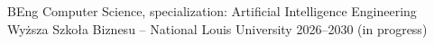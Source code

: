 

\begin{cventries}

  \cventry
    {BEng Computer Science, specialization: Artificial Intelligence Engineering} %
    {Wyższa Szkoła Biznesu -- National Louis University} %
    {} %
    {2026--2030 (in progress)} %
    {}
\end{cventries}
